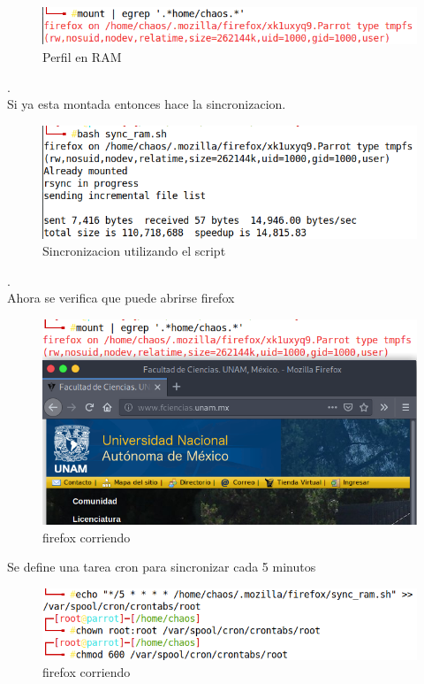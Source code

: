 \documentclass{article}
\begin{document}
\begin{figure}[h!]
\centering
\includegraphics[scale=0.75]{imgs/perfil_en_ram.png}
\caption{Perfil en RAM}
\label{fig:universe}
\end{figure}
. \\ 
Si ya esta montada entonces hace la sincronizacion.
\begin{figure}[h!]
\centering
\includegraphics[scale=0.75]{imgs/sincronizando.png}
\caption{Sincronizacion utilizando el script}
\label{fig:universe}
\end{figure}
. \\
Ahora se verifica que puede abrirse firefox
\begin{figure}[h!]
\centering
\includegraphics[scale=0.8]{imgs/firefox_corriendo.png}
\caption{firefox corriendo}
\label{fig:universe}
\end{figure}

Se define una tarea cron para sincronizar cada 5 minutos
\begin{figure}[h!]
\centering
\includegraphics[scale=0.8]{imgs/crontab.png}
\caption{firefox corriendo}
\label{fig:universe}
\end{figure}
\end{document}
